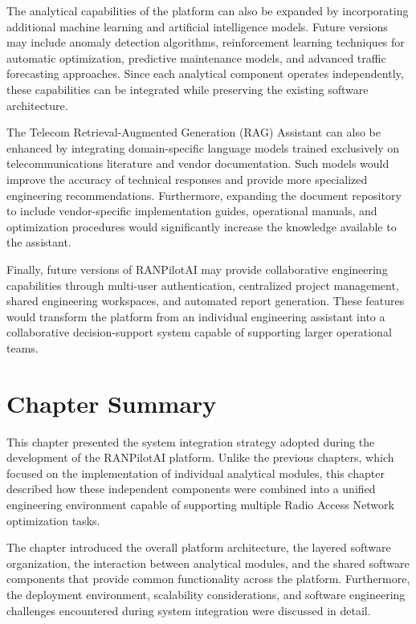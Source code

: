 The analytical capabilities of the platform can also be expanded by incorporating additional machine learning and artificial intelligence models. Future versions may include anomaly detection algorithms, reinforcement learning techniques for automatic optimization, predictive maintenance models, and advanced traffic forecasting approaches. Since each analytical component operates independently, these capabilities can be integrated while preserving the existing software architecture.

The Telecom Retrieval-Augmented Generation (RAG) Assistant can also be enhanced by integrating domain-specific language models trained exclusively on telecommunications literature and vendor documentation. Such models would improve the accuracy of technical responses and provide more specialized engineering recommendations. Furthermore, expanding the document repository to include vendor-specific implementation guides, operational manuals, and optimization procedures would significantly increase the knowledge available to the assistant.

Finally, future versions of RANPilotAI may provide collaborative engineering capabilities through multi-user authentication, centralized project management, shared engineering workspaces, and automated report generation. These features would transform the platform from an individual engineering assistant into a collaborative decision-support system capable of supporting larger operational teams.

\section{Chapter Summary}

This chapter presented the system integration strategy adopted during the development of the RANPilotAI platform. Unlike the previous chapters, which focused on the implementation of individual analytical modules, this chapter described how these independent components were combined into a unified engineering environment capable of supporting multiple Radio Access Network optimization tasks.

The chapter introduced the overall platform architecture, the layered software organization, the interaction between analytical modules, and the shared software components that provide common functionality across the platform. Furthermore, the deployment environment, scalability considerations, and software engineering challenges encountered during system integration were discussed in detail.

